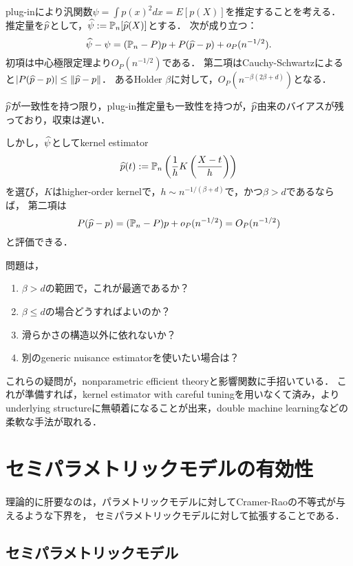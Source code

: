 \documentclass[uplatex,dvipdfmx]{jsreport}
\begin{document}
\begin{example}[第一段階によるバイアスが残る]
    plug-inにより汎関数$\psi=\int p(x)^2dx=E[p(X)]$を推定することを考える．
    推定量を$\widehat{p}$として，$\widehat{\psi}:=\mathbb{P}_n[\widehat{p}(X)]$とする．
    次が成り立つ：
    \[\widehat{\psi}-\psi=(\mathbb{P}_n-P)p+P(\widehat{p}-p)+o_P(n^{-1/2}).\]
    初項は中心極限定理より$O_P(n^{-1/2})$である．
    第二項はCauchy-Schwartzによると$\lvert P(\widehat{p}-p)\rvert\le\|\widehat{p}-p\|$．
    あるHolder $\beta$に対して，$O_P(n^{-\beta(2\beta+d)})$となる．

    $\widehat{p}$が一致性を持つ限り，plug-in推定量も一致性を持つが，$\widehat{p}$由来のバイアスが残っており，収束は遅い．

    しかし，$\widehat{\psi}$としてkernel estimator
    \[\widehat{p}(t):=\mathbb{P}_n\left(\frac{1}{h}K\left(\frac{X-t}{h}\right)\right)\]
    を選び，$K$はhigher-order kernelで，$h\sim n^{-1/(\beta+d)}$で，かつ$\beta>d$であるならば，
    第二項は
    \[P(\widehat{p}-p)=(\mathbb{P}_n-P)p+o_P(n^{-1/2})=O_P(n^{-1/2})\]
    と評価できる．

    問題は，
    \begin{enumerate}
        \item $\beta>d$の範囲で，これが最適であるか？
        \item $\beta\le d$の場合どうすればよいのか？
        \item 滑らかさの構造以外に依れないか？
        \item 別のgeneric nuisance estimatorを使いたい場合は？
    \end{enumerate}
    これらの疑問が，nonparametric efficient theoryと影響関数に手招いている．
    これが準備すれば，kernel estimator with careful tuningを用いなくて済み，よりunderlying structureに無頓着になることが出来，double machine learningなどの柔軟な手法が取れる．
\end{example}

\section{セミパラメトリックモデルの有効性}

\begin{tcolorbox}[colframe=ForestGreen, colback=ForestGreen!10!white,breakable,colbacktitle=ForestGreen!40!white,coltitle=black,fonttitle=\bfseries\sffamily,
title=]
    理論的に肝要なのは，パラメトリックモデルに対してCramer-Raoの不等式が与えるような下界を，
    セミパラメトリックモデルに対して拡張することである．
\end{tcolorbox}

\subsection{セミパラメトリックモデル}
\end{document}
